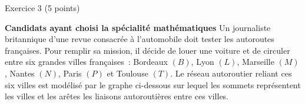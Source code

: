 
%
\begin{h2}Exercice 3 (5 points)\end{h2}
\textbf{Candidats ayant choisi la spécialité \og mathématiques \fg{}}
\medbreak
Un journaliste britannique d'une revue consacrée à l'automobile doit tester les autoroutes
françaises. Pour remplir sa mission, il décide de louer une voiture et de circuler entre six grandes villes françaises~: Bordeaux $(B)$, Lyon $(L)$, Marseille $(M)$, Nantes $(N)$, Paris $(P)$ et Toulouse $(T)$.
\smallbreak
Le réseau autoroutier reliant ces six villes est modélisé par le graphe ci-dessous sur lequel les sommets représentent les villes et les arêtes les liaisons autoroutières entre ces villes.
\begin{center}
     \begin{extern}%
     \end{extern}
\end{center}
\bigbreak
{}
\medbreak
